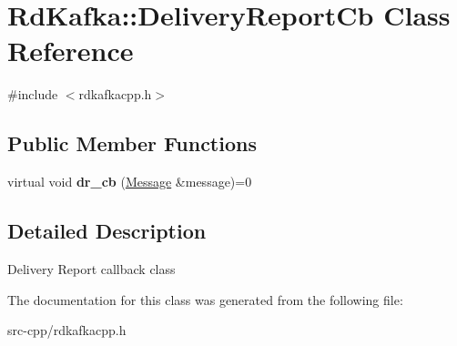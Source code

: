 \hypertarget{classRdKafka_1_1DeliveryReportCb}{\section{Rd\-Kafka\-:\-:Delivery\-Report\-Cb Class Reference}
\label{classRdKafka_1_1DeliveryReportCb}
}


{\ttfamily \#include $<$rdkafkacpp.\-h$>$}

\subsection*{Public Member Functions}
\begin{DoxyCompactItemize}
\item 
\hypertarget{classRdKafka_1_1DeliveryReportCb_a9854b2576802b9e145e6ca402e1646ec}{virtual void {\bfseries dr\-\_\-cb} (\hyperlink{classRdKafka_1_1Message}{Message} \&message)=0}\label{classRdKafka_1_1DeliveryReportCb_a9854b2576802b9e145e6ca402e1646ec}

\end{DoxyCompactItemize}


\subsection{Detailed Description}
Delivery Report callback class 

The documentation for this class was generated from the following file\-:\begin{DoxyCompactItemize}
\item 
src-\/cpp/rdkafkacpp.\-h\end{DoxyCompactItemize}
